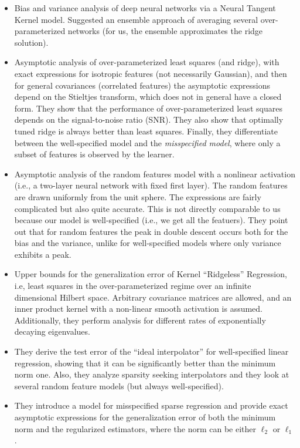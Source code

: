 \documentclass[11pt]{article}
\begin{document}
\begin{itemize}
 \item \cite{GJSx19_TR} Bias and variance analysis of deep neural
   networks via a Neural Tangent Kernel model. Suggested an ensemble
   approach of averaging  several over-parameterized networks (for us,
   the ensemble approximates the ridge solution).

 \item \cite{HMRT19_TR} Asymptotic analysis of over-parameterized
   least squares (and ridge), with exact expressions for isotropic
   features (not necessarily Gaussian), and then for general
   covariances (correlated features) the asymptotic expressions depend on the Stieltjes
   transform, which does not in general have a closed form. They show
   that the performance of over-parameterized least squares depends on
   the signal-to-noise ratio (SNR). They also show that optimally
   tuned ridge is always better than least squares. Finally, they
   differentiate between the well-specified model and the
   \emph{misspecified model}, where only a subset of features is
   observed by the learner.

 \item \cite{MM19_TR} Asymptotic analysis of the random features
   model with a nonlinear activation (i.e., a two-layer neural network
   with fixed first layer). The random features are drawn uniformly
   from the unit sphere. The expressions are fairly complicated but
   also quite accurate. This is not directly comparable to us because
   our model is well-specified (i.e., we get all the featuers). They
   point out that for random features the peak in double descent
   occurs both for the bias and the variance, unlike for
   well-specified models where only variance exhibits a peak.

 \item \cite{LR18_TR}   Upper bounds for the generalization error of
   Kernel ``Ridgeless''   Regression, i.e, least squares in the
   over-parameterized regime over an infinite dimensional Hilbert
   space. Arbitrary covariance matrices are allowed, and an inner
   product kernel with a non-linear smooth activation is
   assumed. Additionally, they
   perform analysis for different rates of exponentially decaying
   eigenvalues.

\item   \cite{MVSS19_TR} They derive the test error of the “ideal interpolator”
   for well-specified linear regression,
   showing that it can be significantly better than the minimum norm
   one. Also, they analyze sparsity seeking interpolators and they
   look at several random feature models (but always well-specified). 

\item  \cite{Mit19_TR} They introduce a model for misspecified sparse
  regression and provide exact asymptotic expressions for the
  generalization error of both the minimum norm and the regularized
  estimators, where the norm can be either $\ell_2$ or $\ell_1$. 
\end{itemize}
\fi

  
\end{document}
